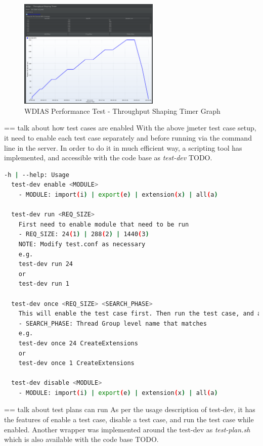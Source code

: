 \begin{figure}[htp]
    \centering
    \includegraphics[width=0.6\textwidth]{results/work_load/test_prod_throughtput_shaping_timer.png}
    \caption{WDIAS Performance Test - Throughput Shaping Timer Graph}
    \label{fi:test_prod_throughtput_shaping_timer}
\end{figure}

== talk about how test cases are enabled
With the above \acrshort{jmeter} test case setup, it need to enable each test case separately and before running via the command line in the server. In order to do it in much efficient way, a scripting tool has implemented, and accessible with the code base \cite{Haggett1998AnWales} as \emph{test-dev} TODO.

\begin{lstlisting}[language=sh, caption=Performance Test Help]
-h | --help: Usage
  test-dev enable <MODULE>
    - MODULE: import(i) | export(e) | extension(x) | all(a)

  test-dev run <REQ_SIZE>
    First need to enable module that need to be run
    - REQ_SIZE: 24(1) | 288(2) | 1440(3)
    NOTE: Modify test.conf as necessary
    e.g.
    test-dev run 24
    or
    test-dev run 1

  test-dev once <REQ_SIZE> <SEARCH_PHASE>
    This will enable the test case first. Then run the test case, and at the end disable and exit.
    - SEARCH_PHASE: Thread Group level name that matches
    e.g.
    test-dev once 24 CreateExtensions
    or
    test-dev once 1 CreateExtensions

  test-dev disable <MODULE>
    - MODULE: import(i) | export(e) | extension(x) | all(a)
\end{lstlisting}

== talk about test plans can run
As per the usage description of test-dev, it has the features of enable a test case, disable a test case, and run the test case while enabled.
Another wrapper was implemented around the test-dev as \emph{test-plan.sh} which is also available with the code base \cite{Haggett1998AnWales} TODO.

